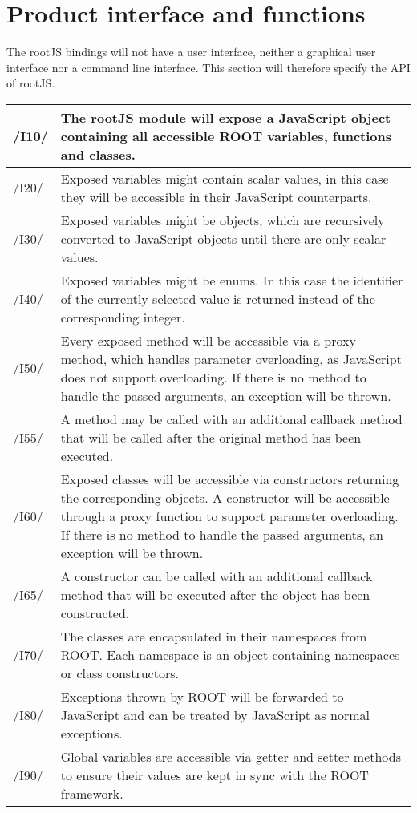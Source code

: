 \chapter{Product interface and functions}
The rootJS bindings will not have a user interface, neither a graphical user interface nor a command line interface.
This section will therefore specify the API of rootJS.


\begin{longtable}{|p{1cm} | p{15cm}|}
  \hline
  /I10/ & The rootJS module will expose a JavaScript object containing all accessible ROOT variables, functions and classes.\\
  \hline
  /I20/ & Exposed variables might contain scalar values, in this case they will be accessible in their JavaScript counterparts.\\
  \hline
  /I30/ & Exposed variables might be objects, which are recursively converted to JavaScript objects until there are only scalar values.\\
  \hline
  /I40/ & Exposed variables might be enums. In this case the identifier of the currently selected value is returned instead of the corresponding integer.\\
  \hline
  /I50/ & Every exposed method will be accessible via a proxy method, which handles parameter overloading, as JavaScript does not support overloading. If there is no method to handle the passed arguments, an exception will be thrown.\\
  \hline
  /I55/ & A method may be called with an additional callback method that will be called after the original method has been executed.\\
  \hline
  /I60/ & Exposed classes will be accessible via constructors returning the corresponding objects. A constructor will be accessible through a proxy function to support parameter overloading. If there is no method to handle the passed arguments, an exception will be thrown.\\
  \hline
  /I65/ & A constructor can be called with an additional callback method that will be executed after the object has been constructed.\\
  \hline
  /I70/ & The classes are encapsulated in their namespaces from ROOT. Each namespace is an object containing namespaces or class constructors.\\
  \hline
  /I80/ & Exceptions thrown by ROOT will be forwarded to JavaScript and can be treated by JavaScript as normal exceptions.\\
  \hline
  /I90/ & Global variables are accessible via getter and setter methods to ensure their values are kept in sync with the ROOT framework.\\
  \hline
\end{longtable}
